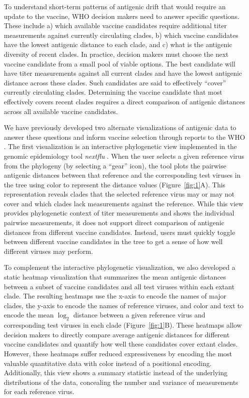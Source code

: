 \documentclass[utf8]{FrontiersinHarvard} %
\begin{document}
To understand short-term patterns of antigenic drift that would require an update to the vaccine, WHO decision makers need to answer specific questions.
These include a) which available vaccine candidates require additional titer measurements against currently circulating clades, b) which vaccine candidates have the lowest antigenic distance to each clade, and c) what is the antigenic diversity of recent clades.
In practice, decision makers must choose the next vaccine candidate from a small pool of viable options.
The best candidate will have titer measurements against all current clades and have the lowest antigenic distance across these clades.
Such candidates are said to effectively ``cover'' currently circulating clades.
Determining the vaccine candidate that most effectively covers recent clades requires a direct comparison of antigenic distances across all available vaccine candidates.

We have previously developed two alternate visualizations of antigenic data to answer these questions and inform vaccine selection through reports to the WHO \citep{BedfordWHO2018,BedfordWHO2019}.
The first visualization is an interactive phylogenetic view implemented in the genomic epidemiology tool \emph{nextflu} \citep{NeherBedford2015,NeherBedford2018}.
When the user selects a given reference virus from the phylogeny (by selecting a ``gear'' icon), the tool plots the pairwise antigenic distances between that reference and the corresponding test viruses in the tree using color to represent the distance values (Figure~\ref{fig:1}A).
This representation reveals clades that the selected reference virus may or may not cover and which clades lack measurements against the reference.
While this view provides phylogenetic context of titer measurements and shows the individual pairwise measurements, it does not support direct comparison of antigenic distances from different vaccine candidates.
Instead, users must quickly toggle between different vaccine candidates in the tree to get a sense of how well different viruses may perform.

To complement the interactive phylogenetic visualization, we also developed a static heatmap visualization that summarizes the mean antigenic distances between a subset of vaccine candidates and all test viruses within each extant clade.
The resulting heatmaps use the x-axis to encode the names of major clades, the y-axis to encode the names of reference viruses, and color and text to encode the mean $\log_{2}$ distance between a given reference virus and corresponding test viruses in each clade (Figure~\ref{fig:1}B).
These heatmaps allow decision makers to directly compare average antigenic distances for different vaccine candidates and quantify how well these candidates cover extant clades.
However, these heatmaps suffer reduced expressiveness by encoding the most valuable quantitative data with color instead of a positional encoding.
Additionally, this view shows a summary statistic instead of the underlying distributions of the data, concealing the number and variance of measurements for each reference virus.
\end{document}
